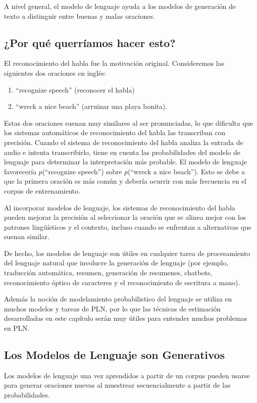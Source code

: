A nivel general, el modelo de lenguaje ayuda a los modelos de generación de texto a distinguir entre buenas y malas oraciones.



\subsection{¿Por qué querríamos hacer esto?}

El reconocimiento del habla fue la motivación original. Consideremos las siguientes dos oraciones en inglés:
\begin{enumerate}
 \item ``recognize speech''  (reconocer el habla)
 \item ``wreck a nice beach'' (arruinar una playa bonita).
\end{enumerate}

Estas dos oraciones suenan muy similares al ser pronunciadas, lo que dificulta que los sistemas automáticos de reconocimiento del habla las transcriban con precisión. Cuando el sistema de reconocimiento del habla analiza la entrada de audio e intenta transcribirlo, tiene en cuenta las probabilidades del modelo de lenguaje para determinar la interpretación más probable.
El modelo de lenguaje favorecería $p$(``recognize speech'') sobre $p$(``wreck a nice beach'').
Esto se debe a que la primera oración es más común y debería ocurrir con más frecuencia en el corpus de entrenamiento.

Al incorporar modelos de lenguaje, los sistemas de reconocimiento del habla pueden mejorar  la precisión al seleccionar la oración que se alinea mejor con los patrones lingüísticos y el contexto, incluso cuando se enfrentan a alternativas que suenan similar.

De hecho, los modelos de lenguaje son útiles en cualquier tarea de procesamiento del lenguaje natural que involucre la generación de lenguaje (por ejemplo, traducción automática, resumen, generación de resumenes, chatbots,  reconocimiento óptico de caracteres y el reconocimiento de escritura a mano).

Además la noción de modelamiento probabilistico del lenguaje se utiliza en muchos modelos y tareas de PLN, por lo que las técnicas de estimación desarrolladas en este capítulo serán muy útiles para entender muchos problemas en PLN.


\subsection{Los Modelos de Lenguaje son Generativos}
Los modelos de lenguaje una vez aprendidos a partir de un corpus pueden usarse para generar oraciones nuevas al muestrear secuencialmente a partir de las probabilidades.

